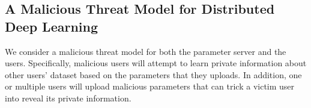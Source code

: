 \documentclass[conference]{IEEEtran}
\begin{document}










\subsection{A Malicious Threat Model for Distributed Deep Learning}\label{sec:threatModel}


We consider a malicious threat model for both the parameter server and the users. Specifically, malicious users will
attempt to learn private information about other users' dataset based on the parameters that they uploads.  In
addition, one or multiple  users will upload malicious parameters that can trick a victim user into reveal its private information. 

  
\end{document}
